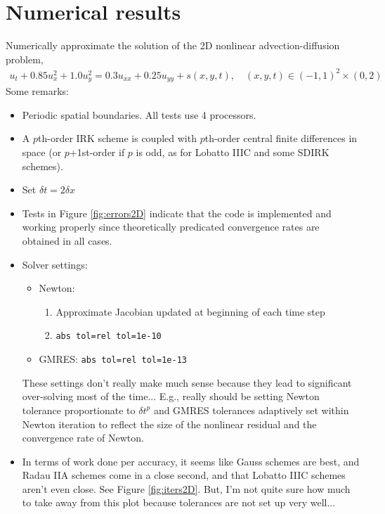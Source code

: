 \documentclass[review]{siamart}
\begin{document}
\newpage
\section{Numerical results}

Numerically approximate the solution of the 2D nonlinear advection-diffusion problem,
\begin{align}
u_t + 0.85 u^2_x + 1.0 u^2_y = 0.3 u_{xx} + 0.25 u_{yy}  + s(x,y,t),
\quad (x,y,t) \in  (-1,1)^2 \times (0, 2)
\end{align}
Some remarks:
\begin{itemize}
\setlength\itemsep{0.5em}
\item Periodic spatial boundaries. All tests use 4 processors.

\item A $p$th-order IRK scheme is coupled with $p$th-order central finite differences in space (or $p$+1st-order if $p$ is odd, as for Lobatto IIIC and some SDIRK schemes).

\item Set $\delta t = 2 \delta x$

\item Tests in Figure \ref{fig:errors2D} indicate that the code is implemented and working properly since theoretically predicated convergence rates are obtained in all cases.

\item Solver settings:
\begin{itemize}
\setlength\itemsep{0.5em}
\item Newton: 
\begin{enumerate}
\item Approximate Jacobian updated at beginning of each time step
\item  \texttt{abs tol=rel tol=1e-10}
\end{enumerate}

\item GMRES: \texttt{abs tol=rel tol=1e-13}
\end{itemize}

These settings don't really make much sense because they lead to significant over-solving most of the time... E.g., really should be setting Newton tolerance proportionate to $\delta t^p$ and GMRES tolerances adaptively set within Newton iteration to reflect the size of the nonlinear residual and the convergence rate of Newton.

\item In terms of work done per accuracy, it seems like Gauss schemes are best, and Radau IIA schemes come in a close second, and that Lobatto IIIC schemes aren't even close. See Figure \ref{fig:iters2D}. But, I'm not quite sure how much to take away from this plot because tolerances are not set up very well...

\end{itemize}
\end{document}
